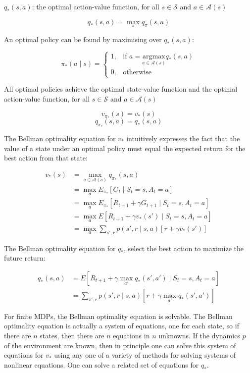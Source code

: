 \documentclass{article}
\begin{document}
\(q_*(s, a)\): the optimal action-value function, for all \(s \in \mathcal{S}\) and \(a \in \mathcal{A}(s)\)

\[q_*(s, a) = \max_{\pi} q_{\pi}(s, a) \]

An optimal policy can be found by maximising over \(q_*(s, a)\):

\[
\pi_*(a \mid s) = 
\begin{cases}
1, & \text{if } a = \underset{a \in \mathcal{A}(s)}{\mathrm{argmax}} q_*(s, a) \\
0, & \text{otherwise}
\end{cases}
\]

All optimal policies achieve the optimal state-value function and the optimal action-value function, 
for all \(s \in \mathcal{S}\) and \(a \in \mathcal{A}(s)\)

\[v_{\pi_*}(s) = v_*(s) \]
\[q_{\pi_*}(s, a) = q_*(s, a) \]

The Bellman optimality equation for \(v_*\) intuitively expresses the fact that the value of a state under an optimal policy must equal the expected return for the best action from that state:

\begin{equation*}
\begin{split}
v_*(s)
& = \max_{a \in \mathcal{A}(s)} q_{\pi_*}(s, a) \\
& = \max_a E_{\pi_*}[G_t \mid S_t = s, A_t = a] \\
& = \max_a E_{\pi_*}[R_{t + 1} + \gamma G_{t + 1} \mid S_t = s, A_t = a] \\
& = \max_a E[R_{t + 1} + \gamma v_*(s') \mid S_t = s, A_t = a] \\
& = \max_a \sum_{s', r} p(s', r \mid s, a) [r + \gamma v_*(s')]
\end{split}
\end{equation*}

The Bellman optimality equation for \(q_*\), select the best action to maximize the future return:

\begin{equation*}
\begin{split}
q_*(s, a)
& = E[R_{t + 1} + \gamma \max_{a'} q_*(s', a') \mid S_t = s, A_t = a] \\
& = \sum_{s', r} p(s', r \mid s, a) [r + \gamma \max_{a'} q_*(s', a')]
\end{split}
\end{equation*}

For finite MDPs, the Bellman optimality equation is solvable. 
The Bellman optimality equation is actually a system of equations, one for each state, 
so if there are \(n\) states, then there are \(n\) equations in \(n\) unknowns. 
If the dynamics \(p\) of the environment are known, then in principle one can solve this system of equations for \(v_*\) using any one of a variety of methods for solving systems of nonlinear equations. 
One can solve a related set of equations for \(q_*\). 
\end{document}
